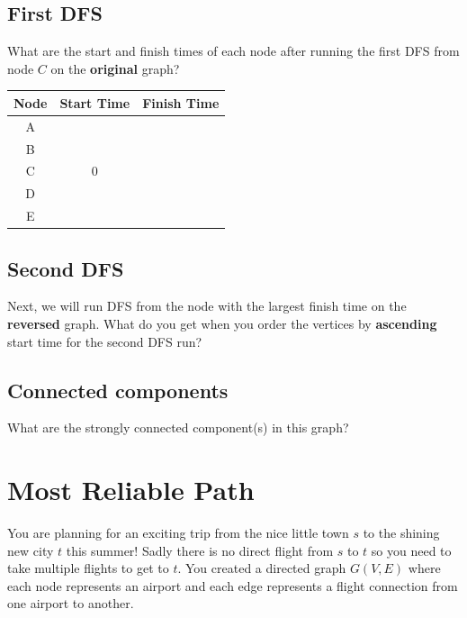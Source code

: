 \documentclass [12pt]{article}
\begin{document}
\subsection{First DFS }
What are the start and finish times of each node after running the first DFS from node $C$ on the \textbf {original} graph?

\begin{tabular}{c| c| c}
Node & Start Time & Finish Time \\ 
\hline A & & \\ 
\hline B & & \\ 
\hline C & 0 & \\ 
\hline D & & \\ 
\hline E & & \\ 
\end{tabular} 


\subsection{Second DFS } 

Next, we will run DFS from the node with the largest finish time on the \textbf{reversed} graph. What do you get when you order the vertices by \textbf{ascending} start time for the second DFS run? 


\subsection{Connected components } 

What are the strongly connected component(s) in this graph?



\pagebreak
\section {Most Reliable Path } 
You are planning for an exciting trip from the nice little town $s$ to the shining new city $t$ this summer! Sadly there is no direct flight from $s$ to $t$ so you need to take multiple flights to get to $t$. You created a directed graph $G(V,E)$ where each node represents an airport and each edge represents a flight connection from one airport to another. 
\end{document}
